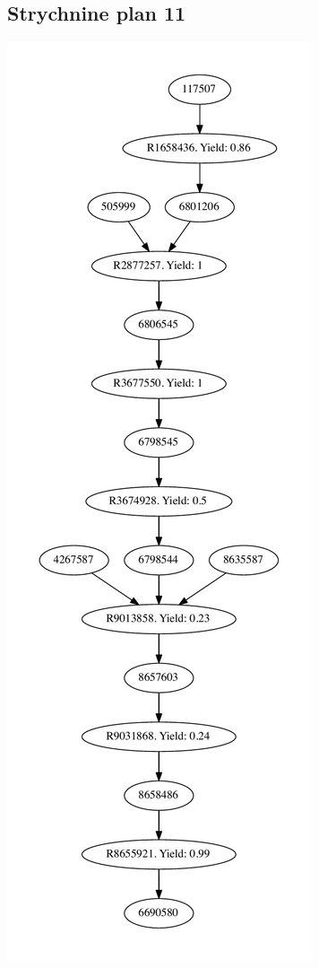 \documentclass[a4paper,10pt,titlepage]{paper}
\begin{document}
\subsection{Strychnine plan 11}
\centering
\includegraphics[scale=0.4]{Synteseplaner/Strychnine/plan11.pdf}
\label{Appendix::Strychnine11}
\end{document}
